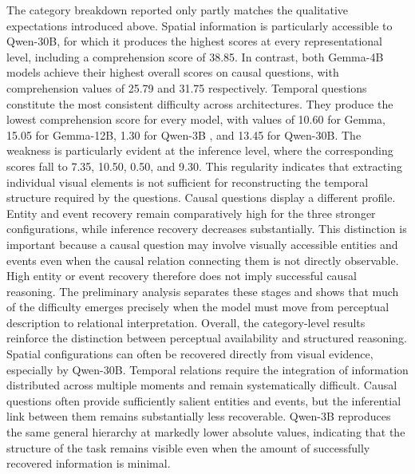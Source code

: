 The category breakdown reported only partly matches the qualitative expectations introduced above. Spatial information is particularly accessible to Qwen-30B, for which it produces the highest scores at every representational level, including a comprehension score of 38.85. In contrast, both Gemma-4B    models achieve their highest overall scores on causal questions, with comprehension values of 25.79 and 31.75 respectively. 
Temporal questions constitute the most consistent difficulty across architectures. They produce the lowest comprehension score for every model, with values of 10.60 for Gemma, 15.05 for Gemma-12B, 1.30 for Qwen-3B , and 13.45 for Qwen-30B. The weakness is particularly evident at the inference level, where the corresponding scores fall to 7.35, 10.50, 0.50, and 9.30. This regularity indicates that extracting individual visual elements is not sufficient for reconstructing the temporal structure required by the questions.
Causal questions display a different profile. Entity and event recovery remain comparatively high for the three stronger configurations, while inference recovery decreases substantially. This distinction is important because a causal question may involve visually accessible entities and events even when the causal relation connecting them is not directly observable. High entity or event recovery therefore does not imply successful causal reasoning. The preliminary analysis separates these stages and shows that much of the difficulty emerges precisely when the model must move from perceptual description to relational interpretation.
Overall, the category-level results reinforce the distinction between perceptual availability and structured reasoning. Spatial configurations can often be recovered directly from visual evidence, especially by Qwen-30B. Temporal relations require the integration of information distributed across multiple moments and remain systematically difficult. Causal questions often provide sufficiently salient entities and events, but the inferential link between them remains substantially less recoverable. Qwen-3B  reproduces the same general hierarchy at markedly lower absolute values, indicating that the structure of the task remains visible even when the amount of successfully recovered information is minimal.
